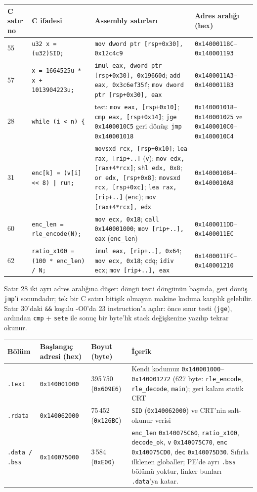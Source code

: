 \documentclass[11pt,a4paper]{article}
\newcommand{\tl}{\texttt}
\newcommand{\hd}[1]{\cellcolor{hdr}#1}
\begin{document}
{\small
\begin{longtable}{|p{1.0cm}|p{3.4cm}|p{6.6cm}|p{3.4cm}|}
\hline
\hd{C satır no} & \hd{C ifadesi} & \hd{Assembly satırları} & \hd{Adres aralığı (hex)}\\
\hline
\endhead
55 & \tl{u32 x = (u32)SID;} & \tl{mov dword ptr [rsp+0x30], 0x12c4c9} & \tl{0x14000118C}--\tl{0x140001193}\\
\hline
57 & \tl{x = 1664525u * x + 1013904223u;} & \tl{imul eax, dword ptr [rsp+0x30], 0x19660d}; \tl{add eax, 0x3c6ef35f}; \tl{mov dword ptr [rsp+0x30], eax} & \tl{0x1400011A3}--\tl{0x1400011B3}\\
\hline
28 & \tl{while (i < n) \{} & test: \tl{mov eax, [rsp+0x10]}; \tl{cmp eax, [rsp+0x14]}; \tl{jge 0x1400010C5} \newline geri dönüş: \tl{jmp 0x140001018} & \tl{0x140001018}--\tl{0x140001025} \newline ve \tl{0x1400010C0}--\tl{0x1400010C4}\\
\hline
31 & \tl{enc[k] = (v[i] << 8) | run;} & \tl{movsxd rcx, [rsp+0x10]}; \tl{lea rax, [rip+..]} (\tl{v}); \tl{mov edx, [rax+4*rcx]}; \tl{shl edx, 0x8}; \tl{or edx, [rsp+0x8]}; \tl{movsxd rcx, [rsp+0xc]}; \tl{lea rax, [rip+..]} (\tl{enc}); \tl{mov [rax+4*rcx], edx} & \tl{0x140001084}--\tl{0x1400010A8}\\
\hline
60 & \tl{enc\_len = rle\_encode(N);} & \tl{mov ecx, 0x18}; \tl{call 0x140001000}; \tl{mov [rip+..], eax} (\tl{enc\_len}) & \tl{0x1400011DD}--\tl{0x1400011EC}\\
\hline
62 & \tl{ratio\_x100 = (100 * enc\_len) / N;} & \tl{imul eax, [rip+..], 0x64}; \tl{mov ecx, 0x18}; \tl{cdq}; \tl{idiv ecx}; \tl{mov [rip+..], eax} & \tl{0x1400011FC}--\tl{0x140001210}\\
\hline
\end{longtable}
}

Satır 28 iki ayrı adres aralığına düşer: döngü testi döngünün başında, geri dönüş \tl{jmp}'i
sonundadır; tek bir C satırı bitişik olmayan makine koduna karşılık gelebilir. Satır 30'daki
\tl{\&\&} koşulu -O0'da 23 instruction'a açılır: önce sınır testi (\tl{jge}), ardından
\tl{cmp} + \tl{sete} ile sonuç bir byte'lık stack değişkenine yazılıp tekrar okunur.

{\small
\begin{longtable}{|p{1.8cm}|p{3.0cm}|p{2.6cm}|p{7.0cm}|}
\hline
\hd{Bölüm} & \hd{Başlangıç adresi (hex)} & \hd{Boyut (byte)} & \hd{İçerik}\\
\hline
\tl{.text} & \tl{0x140001000} & 395\,750 (\tl{0x609E6}) & Kendi kodumuz \tl{0x140001000}--\tl{0x140001272} (627 byte: \tl{rle\_encode}, \tl{rle\_decode}, \tl{main}); geri kalanı statik CRT\\
\hline
\tl{.rdata} & \tl{0x140062000} & 75\,452 (\tl{0x126BC}) & \tl{SID} (\tl{0x140062000}) ve CRT'nin salt-okunur verisi\\
\hline
\tl{.data / .bss} & \tl{0x140075000} & 3\,584 (\tl{0xE00}) & \tl{enc\_len} \tl{0x140075C60}, \tl{ratio\_x100}, \tl{decode\_ok}, \tl{v} \tl{0x140075C70}, \tl{enc} \tl{0x140075CD0}, \tl{dec} \tl{0x140075D30}. Sıfırla ilklenen globaller; PE'de ayrı \tl{.bss} bölümü yoktur, linker bunları \tl{.data}'ya katar.\\
\hline
\end{longtable}
}
\end{document}
